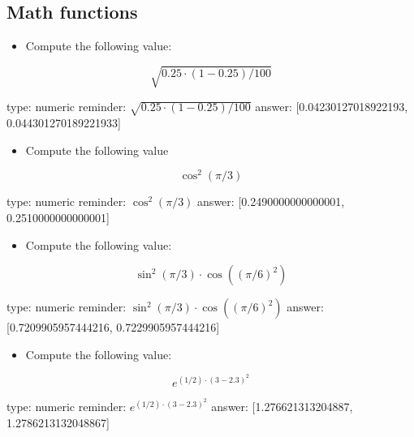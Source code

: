 \documentclass[12pt]{article}
\begin{document}
\subsection{Math functions}

\begin{itemize}
\itemsep1pt\parskip0pt
\item
  Compute the following value:
\end{itemize}

\[
\sqrt{0.25\cdot(1-0.25)/100}
\]

\begin{answer}
    type: numeric
    reminder: \( \sqrt{0.25\cdot(1-0.25)/100} \)
    answer: [0.04230127018922193, 0.044301270189221933]

\end{answer}

\begin{itemize}
\itemsep1pt\parskip0pt
\item
  Compute the following value
\end{itemize}

\[
\cos^2(\pi/3)
\]

\begin{answer}
    type: numeric
    reminder: \( \cos^2(\pi/3) \)
    answer: [0.2490000000000001, 0.2510000000000001]

\end{answer}

\begin{itemize}
\itemsep1pt\parskip0pt
\item
  Compute the following value:
\end{itemize}

\[
\sin^2(\pi/3)  \cdot \cos((\pi/6)^2)
\]

\begin{answer}
    type: numeric
    reminder: \( \sin^2(\pi/3)  \cdot \cos((\pi/6)^2) \)
    answer: [0.7209905957444216, 0.7229905957444216]

\end{answer}

\begin{itemize}
\itemsep1pt\parskip0pt
\item
  Compute the following value:
\end{itemize}

\[
e^{(1/2)\cdot(3 - 2.3)^2}
\]

\begin{answer}
    type: numeric
    reminder: \( e^{(1/2)\cdot(3 - 2.3)^2} \)
    answer: [1.276621313204887, 1.2786213132048867]

\end{answer}
\end{document}
